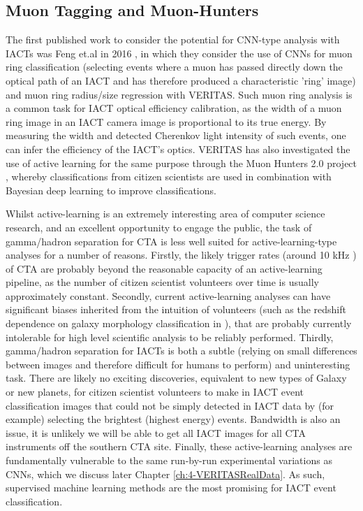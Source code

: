 \subsection{Muon Tagging and Muon-Hunters}
The first published work to consider the potential for CNN-type analysis with IACTs was Feng et.al in 2016 \cite{feng2016}, in which they consider the use of CNNs for muon ring classification (selecting events where a muon has passed directly down the optical path of an IACT and has therefore produced a characteristic 'ring' image) and muon ring radius/size regression with VERITAS. Such muon ring analysis is a common task for IACT optical efficiency calibration, as the width of a muon ring image in an IACT camera image is proportional to its true energy. By measuring the width and detected Cherenkov light intensity of such events, one can infer the efficiency of the IACT's optics. VERITAS has also investigated the use of active learning for the same purpose through the Muon Hunters 2.0 project \cite{muonhunters2}, whereby classifications from citizen scientists are used in combination with Bayesian deep learning to improve classifications.

Whilst active-learning is an extremely interesting area of computer science research, and an excellent opportunity to engage the public, the task of gamma/hadron separation for CTA is less well suited for active-learning-type analyses for a number of reasons. Firstly, the likely trigger rates (around 10 kHz \cite{trigrate}) of CTA are probably beyond the reasonable capacity of an active-learning pipeline, as the number of citizen scientist volunteers over time is usually approximately constant. Secondly, current active-learning analyses can have significant biases inherited from the intuition of volunteers (such as the redshift dependence on galaxy morphology classification in \cite{mike}), that are probably currently intolerable for high level scientific analysis to be reliably performed. Thirdly, gamma/hadron separation for IACTs is both a subtle (relying on small differences between images and therefore difficult for humans to perform) and uninteresting task. There are likely no exciting discoveries, equivalent to new types of Galaxy or new planets, for citizen scientist volunteers to make in IACT event classification images that could not be simply detected in IACT data by (for example) selecting the brightest (highest energy) events. Bandwidth is also an issue, it is unlikely we will be able to get all IACT images for all CTA instruments off the southern CTA site. Finally, these active-learning analyses are fundamentally vulnerable to the same run-by-run experimental variations as CNNs, which we discuss later Chapter \ref{ch:4-VERITASRealData}. As such, supervised machine learning methods are the most promising for IACT event classification.

